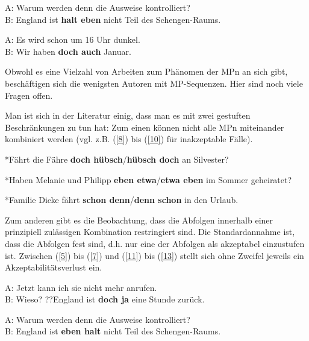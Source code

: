 \begin{exe}
	\ex\label{6} 
		A: Warum werden denn die Ausweise kontrolliert? \\
		B: England ist \textbf{halt eben} nicht Teil des Schengen-Raums.
\end{exe}

\begin{exe}
	\ex\label{7} 
		A: Es wird schon um 16 Uhr dunkel. \\
		B: Wir haben \textbf{doch auch} Januar.
\end{exe}	
Obwohl es eine Vielzahl von Arbeiten zum Phänomen der MPn an sich gibt, beschäftigen sich die wenigsten Autoren mit MP-Sequenzen. Hier sind noch viele Fragen offen.

Man ist sich in der Literatur einig, dass man es mit zwei gestuften Beschränkungen zu tun hat: Zum einen können nicht alle MPn miteinander kombiniert werden (vgl. z.B. (\ref{8}) bis (\ref{10}) für inakzeptable Fälle).

\begin{exe}
	\ex\label{8} 
		*Fährt die Fähre \textbf{doch hübsch}/\textbf{hübsch doch} an Silvester?
\end{exe}
\vspace{-0.65cm}
\begin{exe}
	\ex\label{9} 
		*Haben Melanie und Philipp \textbf{eben etwa}/\textbf{etwa eben} im Sommer geheiratet?
\end{exe}
\vspace{-0.65cm}
\begin{exe}
	\ex\label{10} 
		*Familie Dicke fährt \textbf{schon denn}/\textbf{denn schon} in den Urlaub.
	\newline
	\hbox{}\hfill\hbox{\citet[84]{Mueller2014b}}
\end{exe}	
Zum anderen gibt es die Beobachtung, dass die Abfolgen innerhalb einer prinzi\-piell zulässigen Kombination restringiert sind. Die Standardannahme ist, dass die Abfolgen fest sind, d.h. nur eine der Abfolgen als akzeptabel einzustufen ist. Zwischen (\ref{5}) bis (\ref{7}) und (\ref{11}) bis (\ref{13}) stellt sich ohne Zweifel jeweils ein Akzep\-tabilitätsverlust ein.

\begin{exe}
	\ex\label{11} 
		A: Jetzt kann ich sie nicht mehr anrufen. \\
		B: Wieso? ??England ist \textbf{doch ja} eine Stunde zurück.
\end{exe}

\begin{exe}
	\ex\label{12} 
		A: Warum werden denn die Ausweise kontrolliert? \\
		B: England ist \textbf{eben halt} nicht Teil des Schengen-Raums.
\end{exe}

